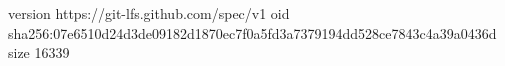 version https://git-lfs.github.com/spec/v1
oid sha256:07e6510d24d3de09182d1870ec7f0a5fd3a7379194dd528ce7843c4a39a0436d
size 16339
